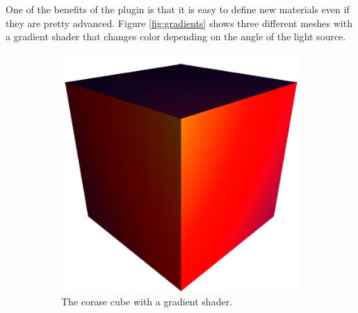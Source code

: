 
One of the benefits of the plugin is that it is easy to define new materials even
if they are pretty advanced. Figure \ref{fig:gradients} shows three different
meshes with a gradient shader that changes color depending on the angle of the
light source.

\begin{figure}
        \centering
        \begin{subfigure}[t]{0.3\textwidth}
                \includegraphics[width=\textwidth]{img/gradientmat0.png}
                \caption{The corase cube with a gradient shader.}
                \label{fig:gradientmat0}
        \end{subfigure}%
        ~ %
        \begin{subfigure}[t]{0.3\textwidth}

\end{subfigure}
\end{figure}
